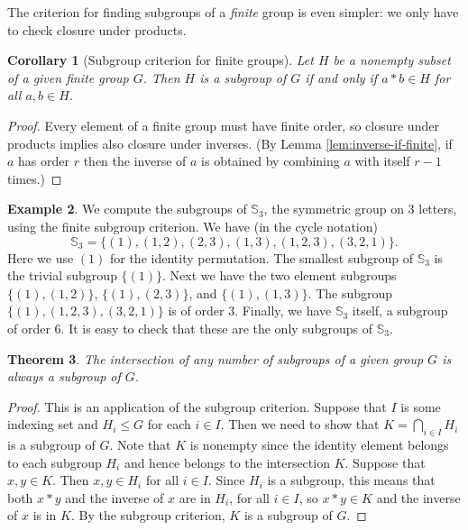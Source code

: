 \documentclass[11pt]{article}
\newtheorem{thm}{Theorem}[section]
\newtheorem{cor}[thm]{Corollary}
\theoremstyle{definition}
\newtheorem{example}[thm]{Example}
\newcommand{\Sym}{\mathbb{S}}
\begin{document}
The criterion for finding subgroups of a \emph{finite} group is even
simpler: we only have to check closure under products.

\begin{cor}[Subgroup criterion for finite groups]
  Let $H$ be a nonempty subset of a given finite group $G$.
  Then $H$ is a subgroup of $G$ if and only if $a*b \in H$ for all
  $a,b \in H$.
\end{cor}

\begin{proof}
Every element of a finite group must have finite order, so closure
under products implies also closure under inverses. (By Lemma
\ref{lem:inverse-if-finite}, if $a$ has order $r$ then the inverse
of $a$ is obtained by combining $a$ with itself $r-1$ times.)
\end{proof}


\begin{example}
We compute the subgroups of $\Sym_3$, the symmetric group on 3 letters,
using the finite subgroup criterion. We have (in the
cycle notation)
\[
\Sym_3 = \{(1), (1,2), (2,3), (1,3), (1,2,3), (3,2,1) \}.
\] 
Here we use $(1)$ for the identity permutation. The smallest subgroup
of $\Sym_3$ is the trivial subgroup $\{(1)\}$. Next we have the two
element subgroups $\{(1), (1,2) \}$, $\{(1), (2,3)\}$, and
$\{(1),(1,3)\}$. The subgroup $\{(1),(1,2,3), (3,2,1) \}$ is of order
3. Finally, we have $\Sym_3$ itself, a subgroup of order 6. It is easy
to check that these are the only subgroups of $\Sym_3$.
\end{example}


\begin{thm}
  The intersection of any number of subgroups of a given group $G$ is
  always a subgroup of $G$.
\end{thm}

\begin{proof}
This is an application of the subgroup criterion. Suppose that $I$ is
some indexing set and $H_i \le G$ for each $i \in I$. Then we need to
show that $K = \bigcap_{i \in I} H_i$ is a subgroup of $G$. Note that
$K$ is nonempty since the identity element belongs to each subgroup
$H_i$ and hence belongs to the intersection $K$. Suppose that $x,y \in
K$. Then $x, y \in H_i$ for all $i \in I$. Since $H_i$ is a subgroup,
this means that both $x*y$ and the inverse of $x$ are in $H_i$, for
all $i \in I$, so $x*y \in K$ and the inverse of $x$ is in $K$. By the
subgroup criterion, $K$ is a subgroup of $G$.
\end{proof}
\end{document}
